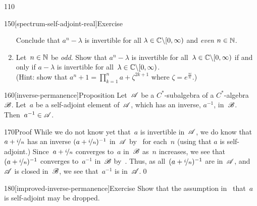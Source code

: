 \begin{parsec}{110}
\begin{point}{150}[spectrum-self-adjoint-real]{Exercise}
\begin{enumerate}
Conclude that $a^n-\lambda$ is invertible for all 
$\lambda\in\mathbb{C}\backslash[0,\infty)$ and \emph{even} $n\in\mathbb{N}$.
\item
Let~$n\in \mathbb{N}$ be \emph{odd}.
Show that $a^n-\lambda$ is invertible
for all~$\lambda\in \mathbb{C}\backslash[0,\infty)$
if and only if $a-\lambda$ is invertible
for all~$\lambda\in \mathbb{C}\backslash[0,\infty)$.\\
(Hint: show that
$a^n+1= \prod_{k=1}^n a+\zeta^{2k+1}$
where $\zeta=e^{\frac{\pi i}{n}}$.)
\end{enumerate}
\end{point}
\begin{point}{160}[inverse-permanence]{Proposition}%
Let~$\mathscr{A}$ be a $C^*$-subalgebra
of a $C^*$-algebra $\mathscr{B}$.
Let~$a$ be a self-adjoint element of~$\mathscr{A}$,
which has an inverse, $a^{-1}$, in~$\mathscr{B}$.
Then~$a^{-1}\in\mathscr{A}$.
\begin{point}{170}{Proof}%
While we do not know yet that~$a$ is invertible in~$\mathscr{A}$,
we do know that~$a+\nicefrac{i}{n}$ 
has an inverse $(a+\nicefrac{i}{n})^{-1}$ in~$\mathscr{A}$
by~
for each~$n$
(using that $a$ is self-adjoint.)
Since~$a+\nicefrac{i}{n}$ converges to~$a$ in~$\mathscr{B}$ as~$n$ increases,
we see that $(a+\nicefrac{i}{n})^{-1}$ converges to~$a^{-1}$
in~$\mathscr{B}$ by~.
Thus, as all~$(a+\nicefrac{i}{n})^{-1}$ are in~$\mathscr{A}$,
and~$\mathscr{A}$ is closed in~$\mathscr{B}$,
we see that~$a^{-1}$ is in~$\mathscr{A}$.\qed
\end{point}
\end{point}
\begin{point}{180}[improved-inverse-permanence]{Exercise}%
	Show that the assumption in~ 
	that~$a$ is self-adjoint
may be dropped. 


\end{point}
\end{parsec}
